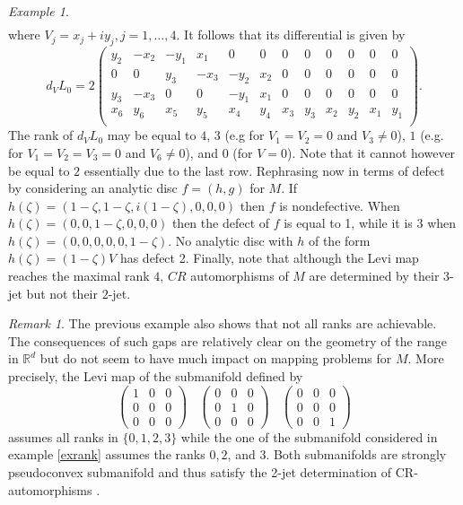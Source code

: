 \documentclass[12pt]{amsart}
\newcommand{\R}{\mathbb R}
\theoremstyle{remark}
\newtheorem{remark}[theo]{Remark}
\theoremstyle{example}
\newtheorem{example}[theo]{Example}
\theoremstyle{definition}
\numberwithin{equation}{section}
\begin{document}
\begin{example}
\begin{eqnarray*}
\end{eqnarray*} 
where $V_j=x_j+iy_j, j=1,\ldots,4.$ It follows that its differential is given by 
$$d_VL_0=
2\begin{pmatrix}
	y_2& -x_2 & -y_1 & x_1 & 0& 0 & 0 & 0 & 0 & 0  & 0 & 0 \\ 
	0& 0  & y_3 & -x_3 & -y_2 & x_2 & 0 & 0 & 0& 0  & 0 & 0\\ 
	y_3& -x_3 & 0 & 0  & -y_1 & x_1 & 0 & 0 & 0  & 0 & 0 & 0\\ 
	x_6& y_6 & x_5 & y_5& x_4 & y_4 & x_3 & y_3 & x_2 & y_2 & x_1 & y_1 \\ 
\end{pmatrix}.$$
The rank of $d_VL_0$ may be equal to $4$, $3$ (e.g for $V_1=V_2=0$ and $V_3 \neq 0$), $1$ (e.g. for $V_1=V_2=V_3=0$ and  $V_6 \neq 0$), and $0$ (for $V=0$). Note that it cannot however be equal to $2$ essentially due to the last row. Rephrasing now in terms of defect by considering an analytic disc $f=(h,g)$ for $M$. If 
$h(\zeta)=(1-\zeta,1-\zeta,i(1-\zeta),0,0,0)$ then $f$ is nondefective. 
When $h(\zeta)=(0,0,1-\zeta,0,0,0)$ then the defect of $f$ is equal to 1, while it is 3 when  $h(\zeta)=(0,0,0,0,0,1-\zeta)$. No analytic disc with 
$h$ of the form $h(\zeta)=(1-\zeta)V$ has defect 2. Finally, note that although the Levi map reaches the maximal rank $4$, $CR$ automorphisms of $M$ are determined by their $3$-jet but not their $2$-jet.          
\end{example}


\begin{remark}
The previous example also shows that not all ranks are achievable. The consequences of such gaps are relatively clear on the geometry of the range in $\R^d$ but do not seem to have much impact on mapping problems for $M$. More precisely, the Levi map of the submanifold
defined by 
$$
\begin{pmatrix}
	1& 0 & 0 \\ 0 &0 & 0 \\ 0 &0 & 0
\end{pmatrix} \ \ \ \ \begin{pmatrix}
	0& 0 & 0 \\ 0 &1 & 0 \\ 0 &0 & 0 
\end{pmatrix}\ \ \ \ \begin{pmatrix}
	0& 0 & 0 \\ 0 &0 & 0 \\ 0 &0 & 1 
\end{pmatrix}$$
assumes all ranks in $\{0,1,2,3\}$ while the one of  the submanifold
considered in example \ref{exrank} assumes the ranks $0,2$, and $3$. Both submanifolds are strongly pseudoconvex submanifold and thus satisfy the 2-jet determination of CR-automorphisms \cite{tu3}.
\end{remark}
\end{document}
